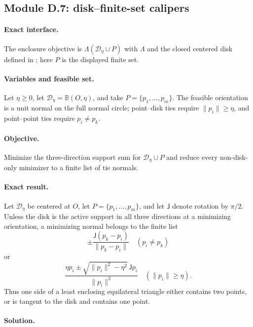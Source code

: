 \subsection{Module D.7: disk--finite-set calipers}

\paragraph{Exact interface.}
The enclosure objective is $\Lambda(\mathcal D_\eta\cup P)$ with $\Lambda$
and the closed centered disk defined in
; here $P$ is the displayed finite set.

\paragraph{Variables and feasible set.}
Let $\eta\ge0$, let $\mathcal D_\eta=\mathbb B(O,\eta)$, and take
$P=\{p_1,\ldots,p_m\}$.  The feasible orientation is a unit normal on the
full normal circle; point--disk ties require $\lVert p_i\rVert\ge\eta$, and
point--point ties require $p_i\ne p_k$.

\paragraph{Objective.}
Minimize the three-direction support sum for $\mathcal D_\eta\cup P$ and
reduce every non-disk-only minimizer to a finite list of tie normals.

\paragraph{Exact result.}

\begin{proposition}
\label{prop:app-disk-finite-caliper}
Let $\mathcal D_\eta$ be centered at $O$, let
$P=\{p_1,\ldots,p_m\}$, and let $\mathsf J$ denote rotation by $\pi/2$.
Unless the disk is the active support in all three directions at a minimizing
orientation, a minimizing normal belongs to the finite list
\[
 \pm\frac{\mathsf J(p_k-p_i)}{\|p_k-p_i\|}
 \quad(p_i\ne p_k)
\]
or
\[
 \frac{\eta p_i\pm
 \sqrt{\|p_i\|^2-\eta^2}\,\mathsf Jp_i}{\|p_i\|^2}
 \quad(\|p_i\|\ge\eta).
\]
Thus one side of a least enclosing equilateral triangle either contains two
points, or is tangent to the disk and contains one point.
\end{proposition}

\paragraph{Solution.}


